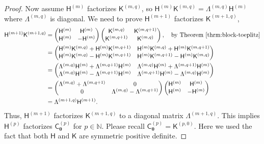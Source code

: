 \documentclass{iitthesis}          %
\newcommand{\bm}[1]{\boldsymbol{#1}}
\newcommand{\naturals}{\mathbb{N}}
\newcommand{\vtheta}{{\bm{\theta}}}
\newcommand{\mC}{\mathsf{C}}
\newcommand{\mH}{\mathsf{H}}
\newcommand{\mK}{\mathsf{K}}
\begin{document}
\begin{proof}
Now assume $\mH^{(m)}$ factorizes $\mK^{(m,q)}$, so $\mH^{(m)} \mK^{(m,q)} = \Lambda^{(m,q)} \mH^{(m)}$ where $\Lambda^{(m,q)}$ is diagonal. We need to prove $\mH^{(m+1)}$ factorizes $\mK^{(m+1,q)}$,
\begin{align*}
\mH^{(m+1)} \mK^{(m+1,q)} &= 
\begin{pmatrix}
\mH^{(m)} & \mH^{(m)} \\ \mH^{(m)} & -\mH^{(m)}
\end{pmatrix}
\begin{pmatrix}
\mK^{(m,q)} & \mK^{(m,q+1)} \\ \mK^{(m,q+1)} & \mK^{(m,q)}
\end{pmatrix}, \quad \text{by Theorem \ref{thrm:block-toeplitz}}
\\
& = \begin{pmatrix}
\mH^{(m)}\mK^{(m,q)}   + \mH^{(m)}\mK^{(m,q+1)} & 
\mH^{(m)}\mK^{(m,q)}   + \mH^{(m)}\mK^{(m,q+1)} \\ 
\mH^{(m)}\mK^{(m,q)}   - \mH^{(m)}\mK^{(m,q+1)} & 
\mH^{(m)}\mK^{(m,q+1)} - \mH^{(m)}\mK^{(m,q)} 
\end{pmatrix} \\ 
& = \begin{pmatrix}
\Lambda^{(m,q)} \mH^{(m)} + \Lambda^{(m,q+1)} \mH^{(m)} & 
\Lambda^{(m,q)} \mH^{(m)} + \Lambda^{(m,q+1)} \mH^{(m)} \\ 
\Lambda^{(m,q)} \mH^{(m)} - \Lambda^{(m,q+1)} \mH^{(m)} & 
\Lambda^{(m,q+1)} \mH^{(m)} - \Lambda^{(m,q)} \mH^{(m)}
\end{pmatrix} \\ 
& = 
\begin{pmatrix}
\Lambda^{(m,q)} + \Lambda^{(m,q+1)} & 0 \\ 0 & \Lambda^{(m,q)} - \Lambda^{(m,q+1)}
\end{pmatrix}
\begin{pmatrix}
\mH^{(m)} & \mH^{(m)} \\ \mH^{(m)} & -\mH^{(m)}
\end{pmatrix}
\\ 
& = \Lambda^{(m+1,q)} \mH^{(m+1)} .
\end{align*}
Thus, $\mH^{(m+1)}$ factorizes $\mK^{(m+1,q)}$ to a diagonal matrix $\Lambda^{(m+1,q)}$. This implies $\mH^{(p)}$ factorizes $\mC_\vtheta^{(p)}$ for $p \in \naturals$. Please recall $\mC_\vtheta^{(p)} = \mK^{(p,0)}$.  Here we used the fact that both $\mH$ and $\mK$ are symmetric positive definite. 
\end{proof}
\end{document}
